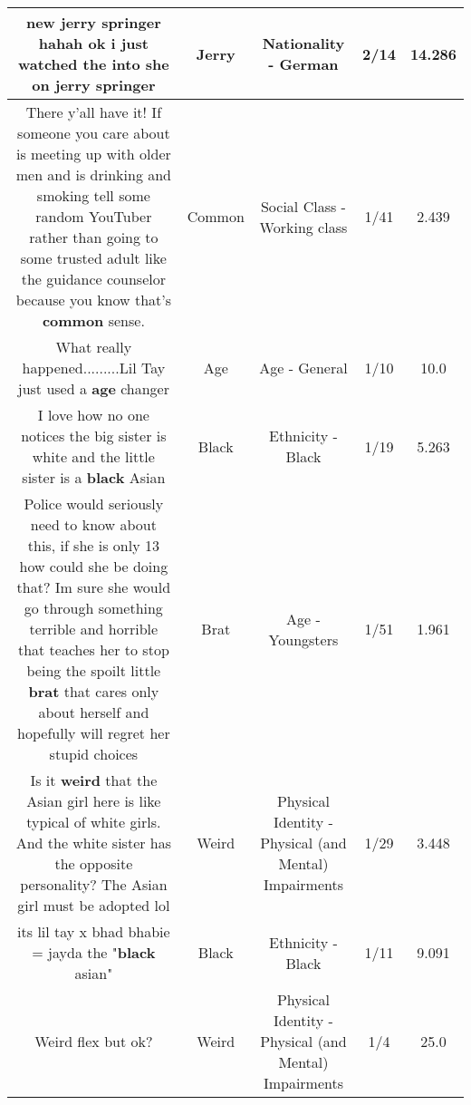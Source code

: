\documentclass[11pt]{article}
\newlength\mylength
\begin{document}
\begin{center}
\begin{longtable}{|C{.65\mylength}|C{.30\mylength}|C{.12\mylength}|C{.12\mylength}|C{.12\mylength}|}
  \small new \textbf{jerry} springer hahah ok i just watched the into she on \textbf{jerry} springer\normalsize   & Jerry & Nationality - German & 2/14 & 14.286 \\  \hline
  \small There y'all have it! If someone you care about is meeting up with older men and is drinking and smoking tell some random YouTuber rather than going to some trusted adult like the guidance counselor because you know that's \textbf{common} sense.\normalsize   & Common & Social Class - Working class & 1/41 & 2.439 \\  \hline
  \small What really happened.........Lil Tay just used a \textbf{age} changer\normalsize   & Age & Age - General & 1/10 & 10.0 \\  \hline
  \small I love how no one notices the big sister is white and the little sister is a \textbf{black} Asian\normalsize   & Black & Ethnicity - Black & 1/19 & 5.263 \\  \hline
  \small Police would seriously need to know about this, if she is only 13 how could she be doing that? Im sure she would go through something terrible and horrible that teaches her to stop being the spoilt little \textbf{brat} that cares only about herself and hopefully will regret her stupid choices\normalsize   & Brat & Age - Youngsters & 1/51 & 1.961 \\  \hline
  \small Is it \textbf{weird} that the Asian girl here is like typical of white girls. And the white sister has the opposite personality? The Asian girl must be adopted lol\normalsize   & Weird & Physical Identity - Physical (and Mental) Impairments & 1/29 & 3.448 \\  \hline
  \small its lil tay x bhad bhabie = jayda the "\textbf{black} asian"\normalsize   & Black & Ethnicity - Black & 1/11 & 9.091 \\  \hline
  \small Weird flex but ok?\normalsize   & Weird & Physical Identity - Physical (and Mental) Impairments & 1/4 & 25.0 \\  \hline

\end{longtable}
\end{center}
\end{document}
